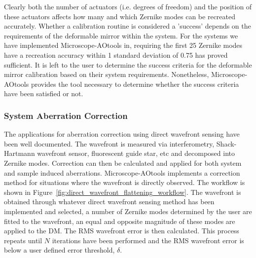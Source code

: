Clearly both the number of actuators (i.e. degrees of freedom) and the position of these actuators affects how many and which Zernike modes can be recreated accurately. Whether a calibration routine is considered a 'success' depends on the requirements of the deformable mirror within the system. For the systems we have implemented Microscope-AOtools in, requiring the first 25 Zernike modes have a recreation accuracy within 1 standard deviation of 0.75 has proved sufficient. It is left to the user to determine the success criteria for the deformable mirror calibration based on their system requirements. Nonetheless, Microscope-AOtools provides the tool necessary to determine whether the success criteria have been satisfied or not.

\subsubsection{System Aberration Correction}
\label{subsubsec:system_correction}

The applications for aberration correction using direct wavefront sensing have been well documented. The wavefront is measured via interferometry, Shack-Hartmann wavefront sensor, fluorescent guide star, etc and decomposed into Zernike modes. Correction can then be calculated and applied for both system and sample induced aberrations. Microscope-AOtools implements a correction method for situations where the wavefront is directly observed. The workflow is shown in Figure~\ref{fig:direct_wavefront_flattening_workflow}. The wavefront is obtained through whatever direct wavefront sensing method has been implemented and selected, a number of Zernike modes determined by the user are fitted to the wavefront, an equal and opposite magnitude of these modes are applied to the DM. The RMS wavefront error is then calculated. This process repeats until $N$ iterations have been performed and the RMS wavefront error is below a user defined error threshold, $\delta$.

